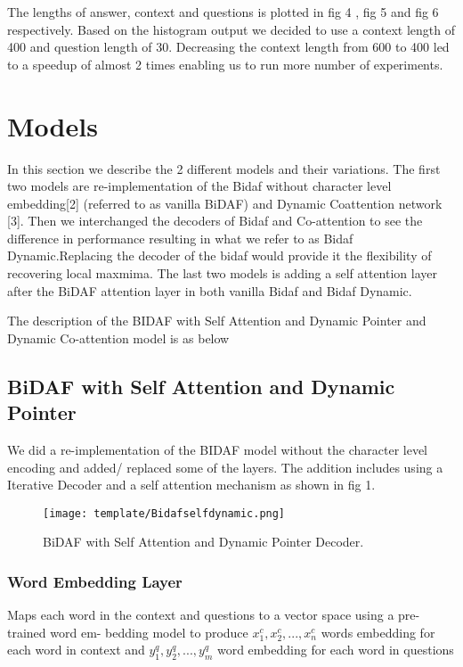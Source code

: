 \documentclass{article} %
\begin{document}
The lengths of answer, context and questions is plotted in fig 4 , fig 5 and fig 6 respectively. Based on the histogram output we decided to use a context length of 400 and question length of 30. Decreasing the context length from 600 to 400 led to a speedup of almost 2 times enabling us to run more number of experiments.


\section{Models}
In this section we describe the 2 different models and their variations. The first two models are re-implementation of the Bidaf without character level embedding[2] (referred to as vanilla BiDAF) and Dynamic Coattention network [3]. Then we interchanged the decoders of Bidaf and Co-attention to see the difference in performance resulting in what we refer to as Bidaf Dynamic.Replacing the decoder of the bidaf would provide it the flexibility of recovering local maxmima. The last two models is adding a self attention layer after the BiDAF attention layer in both vanilla Bidaf and Bidaf Dynamic. 

The description of the BIDAF with Self Attention and Dynamic Pointer and Dynamic Co-attention model is as below

\subsection{BiDAF with Self Attention and Dynamic Pointer}

We did a re-implementation of the BIDAF model without the character level encoding and added/ replaced some of the layers. The addition includes using a Iterative Decoder and a self attention mechanism as shown in fig 1.

\begin{figure}
\texttt{[image: template/Bidafselfdynamic.png]}
\centering
\caption{BiDAF with Self Attention and Dynamic Pointer Decoder.}
\end{figure}

\subsubsection{Word Embedding Layer}
Maps each word in the context and questions to a vector space using a pre-trained word em- bedding model to produce \( x^{c}_{1} , x^{c}_{2} , . . . , x^{c}_{n} \)  words embedding for each word in  context and \(y^{q}_{1} , y^{q}_{2} , . . . , y^{q}_{m} \) word embedding for each word in questions
\end{document}
